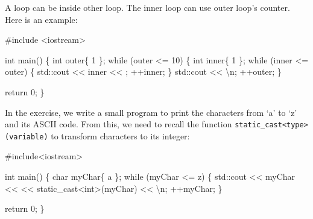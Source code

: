 \documentclass[
  letterpaper,
  DIV=11,
  numbers=noendperiod]{scrreprt}
\newenvironment{Shaded}{\begin{snugshade}}{\end{snugshade}}
\newcommand{\CommentTok}[1]{\textcolor[rgb]{0.37,0.37,0.37}{#1}}
\newcommand{\ControlFlowTok}[1]{\textcolor[rgb]{0.00,0.23,0.31}{#1}}
\newcommand{\DecValTok}[1]{\textcolor[rgb]{0.68,0.00,0.00}{#1}}
\newcommand{\ErrorTok}[1]{\textcolor[rgb]{0.68,0.00,0.00}{#1}}
\newcommand{\FunctionTok}[1]{\textcolor[rgb]{0.28,0.35,0.67}{#1}}
\newcommand{\NormalTok}[1]{\textcolor[rgb]{0.00,0.23,0.31}{#1}}
\newcommand{\SpecialCharTok}[1]{\textcolor[rgb]{0.37,0.37,0.37}{#1}}
\newcommand{\StringTok}[1]{\textcolor[rgb]{0.13,0.47,0.30}{#1}}
\begin{document}
A loop can be inside other loop. The inner loop can use outer loop's
counter. Here is an example:

\begin{Shaded}
\begin{Highlighting}[]
\CommentTok{\#include \textless{}iostream\textgreater{}}

\NormalTok{int }\FunctionTok{main}\NormalTok{()}
\NormalTok{\{}
\NormalTok{    int outer\{ }\DecValTok{1}\NormalTok{ \};}
    \ControlFlowTok{while}\NormalTok{ (outer }\SpecialCharTok{\textless{}=} \DecValTok{10}\NormalTok{)}
\NormalTok{    \{}
\NormalTok{        int inner\{ }\DecValTok{1}\NormalTok{ \};}
        \ControlFlowTok{while}\NormalTok{ (inner }\SpecialCharTok{\textless{}=}\NormalTok{ outer)}
\NormalTok{        \{}
\NormalTok{            std}\SpecialCharTok{::}\NormalTok{cout }\SpecialCharTok{\textless{}}\ErrorTok{\textless{}}\NormalTok{ inner }\SpecialCharTok{\textless{}}\ErrorTok{\textless{}} \StringTok{\textquotesingle{} \textquotesingle{}}\NormalTok{;}
            \SpecialCharTok{++}\NormalTok{inner;}
\NormalTok{        \}}
\NormalTok{        std}\SpecialCharTok{::}\NormalTok{cout }\SpecialCharTok{\textless{}}\ErrorTok{\textless{}} \StringTok{\textquotesingle{}}\SpecialCharTok{\textbackslash{}n}\StringTok{\textquotesingle{}}\NormalTok{;}
        \SpecialCharTok{++}\NormalTok{outer;}
\NormalTok{    \}}

\NormalTok{    return }\DecValTok{0}\NormalTok{;}
\NormalTok{\}}
\end{Highlighting}
\end{Shaded}

In the exercise, we write a small program to print the characters from
`a' to `z' and its ASCII code. From this, we need to recall the function
\texttt{static\_cast\textless{}type\textgreater{}(variable)} to
transform characters to its integer:

\begin{Shaded}
\begin{Highlighting}[]
\CommentTok{\#include\textless{}iostream\textgreater{}}

\NormalTok{int }\FunctionTok{main}\NormalTok{()}
\NormalTok{\{}
\NormalTok{    char myChar\{ }\StringTok{\textquotesingle{}a\textquotesingle{}}\NormalTok{ \};}
    \ControlFlowTok{while}\NormalTok{ (myChar }\SpecialCharTok{\textless{}=} \StringTok{\textquotesingle{}z\textquotesingle{}}\NormalTok{)}
\NormalTok{    \{}
\NormalTok{        std}\SpecialCharTok{::}\NormalTok{cout }\SpecialCharTok{\textless{}}\ErrorTok{\textless{}}\NormalTok{ myChar }\SpecialCharTok{\textless{}}\ErrorTok{\textless{}} \StringTok{\textquotesingle{} \textquotesingle{}} \SpecialCharTok{\textless{}}\ErrorTok{\textless{}}\NormalTok{ static\_cast}\SpecialCharTok{\textless{}}\NormalTok{int}\SpecialCharTok{\textgreater{}}\NormalTok{(myChar) }\SpecialCharTok{\textless{}}\ErrorTok{\textless{}} \StringTok{\textquotesingle{}}\SpecialCharTok{\textbackslash{}n}\StringTok{\textquotesingle{}}\NormalTok{;}
        \SpecialCharTok{++}\NormalTok{myChar;}
\NormalTok{    \}}

\NormalTok{    return }\DecValTok{0}\NormalTok{;}
\NormalTok{\}}
\end{Highlighting}
\end{Shaded}
\end{document}
